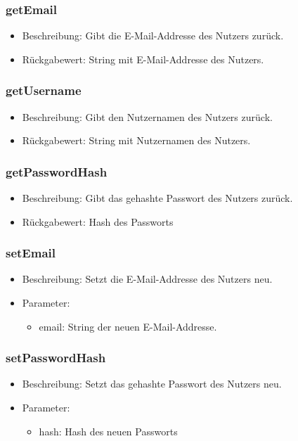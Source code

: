 \documentclass[a4paper]{scrreprt}
\begin{document}
    \subsubsection{getEmail}
    \begin{itemize}
        \item Beschreibung: Gibt die E-Mail-Addresse des Nutzers zurück.
        \item Rückgabewert: String mit E-Mail-Addresse des Nutzers.
    \end{itemize}

    \subsubsection{getUsername}
    \begin{itemize}
        \item Beschreibung: Gibt den Nutzernamen des Nutzers zurück.
        \item Rückgabewert: String mit Nutzernamen des Nutzers.
    \end{itemize}

    \subsubsection{getPasswordHash}
    \begin{itemize}
        \item Beschreibung: Gibt das gehashte Passwort des Nutzers zurück.
        \item Rückgabewert: Hash des Passworts
    \end{itemize}

    \subsubsection{setEmail}
    \begin{itemize}
        \item Beschreibung: Setzt die E-Mail-Addresse des Nutzers neu.
        \item Parameter:
        \begin{itemize}
            \item email: String der neuen E-Mail-Addresse.
        \end{itemize}
    \end{itemize}

    \subsubsection{setPasswordHash}
    \begin{itemize}
        \item Beschreibung: Setzt das gehashte Passwort des Nutzers neu.
        \item Parameter:
        \begin{itemize}
            \item hash: Hash des neuen Passworts
        \end{itemize}
    \end{itemize}
\end{document}
